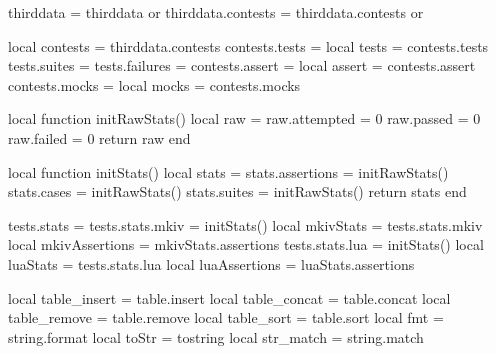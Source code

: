 thirddata          = thirddata          or {}
thirddata.contests = thirddata.contests or {}

local contests  = thirddata.contests
contests.tests  = {}
local tests     = contests.tests
tests.suites    = {}
tests.failures  = {}
contests.assert = {}
local assert    = contests.assert
contests.mocks  = {}
local mocks     = contests.mocks

local function initRawStats()
  local raw = {}
  raw.attempted  = 0
  raw.passed     = 0
  raw.failed     = 0
  return raw
end

local function initStats()
  local stats = {}
  stats.assertions = initRawStats()
  stats.cases      = initRawStats()
  stats.suites     = initRawStats()
  return stats
end

tests.stats          = {}
tests.stats.mkiv     = initStats()
local mkivStats      = tests.stats.mkiv
local mkivAssertions = mkivStats.assertions
tests.stats.lua      = initStats()
local luaStats       = tests.stats.lua
local luaAssertions  = luaStats.assertions

local table_insert = table.insert
local table_concat = table.concat
local table_remove = table.remove
local table_sort   = table.sort
local fmt          = string.format
local toStr        = tostring
local str_match    = string.match

\stopLuaCode

\stopchapter
